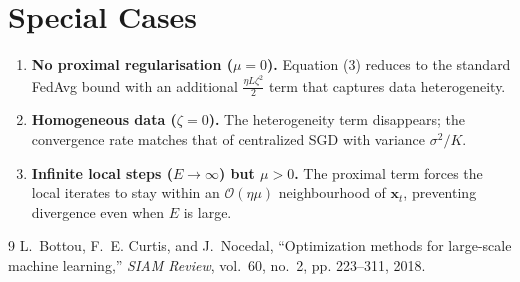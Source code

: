 \documentclass{article}
\begin{document}
\section*{Special Cases}
\begin{enumerate}
\item \textbf{No proximal regularisation ($\mu=0$).}  
Equation (3) reduces to the standard FedAvg bound with an additional $\frac{\eta L\zeta^2}{2}$ term that captures data heterogeneity.
\item \textbf{Homogeneous data ($\zeta=0$).}  
The heterogeneity term disappears; the convergence rate matches that of centralized SGD with variance $\sigma^2/K$.
\item \textbf{Infinite local steps ($E\to\infty$) but $\mu>0$.}  
The proximal term forces the local iterates to stay within an $\mathcal{O}(\eta\mu)$ neighbourhood of $\mathbf{x}_t$, preventing divergence even when $E$ is large.
\end{enumerate}

\begin{thebibliography}{9}
L.~Bottou, F.~E. Curtis, and J.~Nocedal, ``Optimization methods for large-scale machine learning,'' \emph{SIAM Review}, vol.~60, no.~2, pp. 223--311, 2018.
\end{thebibliography}
\end{document}
